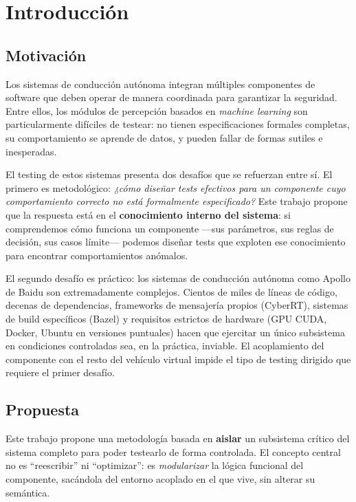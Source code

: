 \chapter{Introducción}
\label{cap:introduccion}

\section{Motivación}

Los sistemas de conducción autónoma integran múltiples componentes de software que deben operar de manera coordinada para garantizar la seguridad. Entre ellos, los módulos de percepción basados en \textit{machine learning} son particularmente difíciles de testear: no tienen especificaciones formales completas, su comportamiento se aprende de datos, y pueden fallar de formas sutiles e inesperadas.

El testing de estos sistemas presenta dos desafíos que se refuerzan entre sí. El primero es metodológico: \textit{¿cómo diseñar tests efectivos para un componente cuyo comportamiento correcto no está formalmente especificado?} Este trabajo propone que la respuesta está en el \textbf{conocimiento interno del sistema}: si comprendemos cómo funciona un componente ---sus parámetros, sus reglas de decisión, sus casos límite--- podemos diseñar tests que exploten ese conocimiento para encontrar comportamientos anómalos.

El segundo desafío es práctico: los sistemas de conducción autónoma como Apollo de Baidu son extremadamente complejos. Cientos de miles de líneas de código, decenas de dependencias, frameworks de mensajería propios (CyberRT), sistemas de build específicos (Bazel) y requisitos estrictos de hardware (GPU CUDA, Docker, Ubuntu en versiones puntuales) hacen que ejercitar un único subsistema en condiciones controladas sea, en la práctica, inviable. El acoplamiento del componente con el resto del vehículo virtual impide el tipo de testing dirigido que requiere el primer desafío.

\section{Propuesta}

Este trabajo propone una metodología basada en \textbf{aislar} un subsistema crítico del sistema completo para poder testearlo de forma controlada. El concepto central no es ``reescribir'' ni ``optimizar'': es \textit{modularizar} la lógica funcional del componente, sacándola del entorno acoplado en el que vive, sin alterar su semántica.

